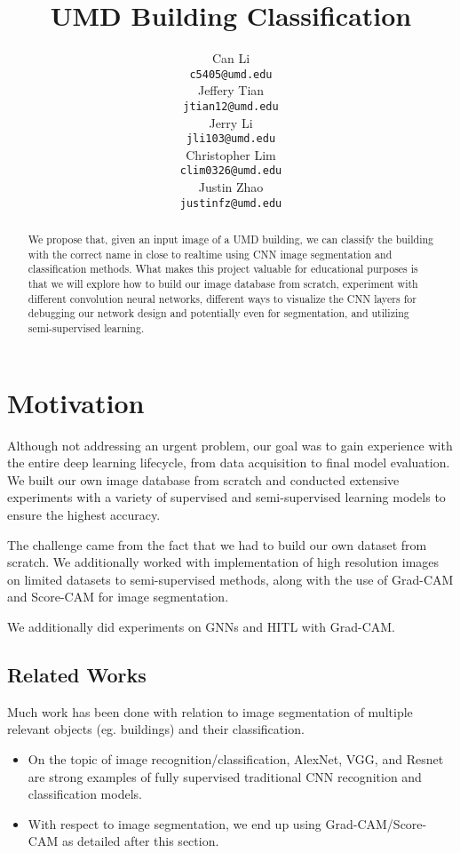 \documentclass{article}
\title{ UMD Building Classification }
\author{%
  Can Li \\
  \texttt{c5405@umd.edu} \\
  \And 
  Jeffery Tian \\
  \texttt{jtian12@umd.edu} \\
  \And 
  Jerry Li\\
  \texttt{jli103@umd.edu} \\
  \And 
  Christopher Lim \\
  \texttt{clim0326@umd.edu} \\
  \And 
  Justin Zhao \\
  \texttt{justinfz@umd.edu} \\
}
\begin{document}
\maketitle


\begin{abstract}
  We propose that, given an input image of a UMD building, we can classify the building with the correct name in close to realtime using CNN image segmentation and classification methods. What makes this project valuable for educational purposes is that we will explore how to build our image database from scratch, experiment with different convolution neural networks, different ways to visualize the CNN layers for debugging our network design and potentially even for segmentation, and utilizing semi-supervised learning.
\end{abstract}


\section{Motivation}
\label{motivation}

Although not addressing an urgent problem, our goal was to gain experience with the entire deep learning lifecycle, from data acquisition to final model evaluation. We built our own image database from scratch and conducted extensive experiments with a variety of supervised and semi-supervised learning models to ensure the highest accuracy.

The challenge came from the fact that we had to build our own dataset from scratch. We additionally worked with implementation of high resolution images on limited datasets to semi-supervised methods, along with the use of Grad-CAM and Score-CAM for image segmentation.

We additionally did experiments on GNNs and HITL with Grad-CAM.

\subsection{Related Works}

Much work has been done with relation to image segmentation of multiple relevant objects (eg. buildings) and their classification.

\begin{itemize}
    \item On the topic of image recognition/classification, AlexNet, VGG, and Resnet\cite{krizhevsky}\cite{simonyan}\cite{he} are strong examples of fully supervised traditional CNN recognition and classification models. 
    \item With respect to image segmentation, we end up using Grad-CAM/Score-CAM as detailed after this section.
\end{itemize}
\end{document}

